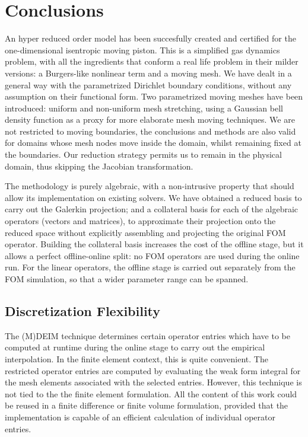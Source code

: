 \documentclass[thesis.tex]{subfiles}
\begin{document}
\section{Conclusions}
An hyper reduced order model has been succesfully created and certified for
the one-dimensional isentropic moving piston.
This is a simplified gas dynamics problem, 
with all the ingredients that conform a real life problem in their milder versions:
a Burgers-like nonlinear term and a moving mesh.
We have dealt in a general way with the parametrized Dirichlet boundary conditions,
without any assumption on their functional form.
Two parametrized moving meshes have been introduced: 
uniform and non-uniform mesh stretching, 
using a Gaussian bell density function as a proxy
for more elaborate mesh moving techniques.
We are not restricted to moving boundaries, 
the conclusions and methods are also valid for domains 
whose mesh nodes move inside the domain, 
whilst remaining fixed at the boundaries.
Our reduction strategy permits us to remain in the physical domain, 
thus skipping the Jacobian transformation.

The methodology is purely algebraic, 
with a non-intrusive property that should allow its implementation on existing solvers.
We have obtained a reduced basis to carry out the Galerkin projection;
and a collateral basis for each of the algebraic operators (vectors and matrices),
to approximate their projection onto the reduced space 
without explicitly assembling and projecting the original FOM operator.
Building the collateral basis increases the cost of the offline stage,
but it allows a perfect offline-online split:
no FOM operators are used during the online run. 
For the linear operators, the offline stage is carried out separately from the FOM simulation,
so that a wider parameter range can be spanned. 

\subsection{Discretization Flexibility}
The (M)DEIM technique determines certain operator entries which 
have to be computed at runtime during the online stage 
to carry out the empirical interpolation.
In the finite element context, this is quite convenient.
The restricted operator entries are computed by evaluating the weak form integral
for the mesh elements associated with the selected entries. 
However, this technique is not tied to the the finite element formulation.
All the content of this work could be reused in a finite difference or finite volume formulation,
provided that the implementation is capable of an efficient calculation of individual operator entries.
\end{document}
